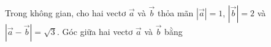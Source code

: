 \begin{ex}
Trong không gian, cho hai vectơ $\vec{a}$ và $\vec{b}$ thỏa mãn $|\vec{a}|=1$, $|\vec{b}|=2$ và $|\vec{a}-\vec{b}|=\sqrt3$. Góc giữa hai vectơ $\vec{a}$ và $\vec{b}$ bằng
\end{ex}
